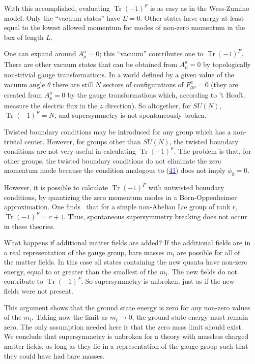 \documentclass[11pt,a4paper]{article}
\newcommand{\eqnref}[1]{(\hyperlink{eq:#1}{\textcolor{blue}{#1}})}
\begin{document}
With this accomplished, evaluating $\operatorname{Tr}(-1)^F$ is as easy as in the
Wess-Zumino model. Only the ``vacuum states'' have $E = 0$. Other
states have energy at least equal to the lowest allowed momentum for
modes of non-zero momentum in the box of length $L$.

One can expand around $A_\mu^a = 0$; this ``vacuum'' contributes one to
$\operatorname{Tr}(-1)^F$. There are other vacuum states that can be obtained from
$A_\mu^a = 0$ by topologically non-trivial gauge transformations. In a
world defined by a given value of the vacuum angle $\theta$ there are still
$N$ sectors of configurations of $F_{\mu\nu}^a = 0$ (they are created from $A_\mu^a = 0$
by the gauge transformations which, according to 't Hooft, measure
the electric flux in the $z$ direction). So altogether, for $SU(N)$,
$\operatorname{Tr}(-1)^F = N$, and supersymmetry is not spontaneously broken.

Twisted boundary conditions may be introduced for any group
which has a non-trivial center. However, for groups other than $SU(N)$,
the twisted boundary conditions are not very useful in calculating
$\operatorname{Tr}(-1)^F$. The problem is that, for other groups, the twisted boundary
conditions do not eliminate the zero momentum mode because the
condition analogous to \eqnref{41} does not imply $\phi_0 = 0$.

However, it is possible to calculate $\operatorname{Tr}(-1)^F$ with untwisted
boundary conditions, by quantizing the zero momentum modes in a
Born-Oppenheimer approximation. One finds~\cite{ref12} that for a simple non-Abelian
Lie group of rank $r$, $\operatorname{Tr}(-1)^F = r + 1$. Thus, spontaneous supersymmetry
breaking does not occur in these theories.

What happens if additional matter fields are added? If the additional
fields are in a real representation of the gauge group, bare
masses $m_i$ are possible for all of the matter fields. In this case
all states containing the new quanta have non-zero energy, equal to
or greater than the smallest of the $m_i$. The new fields do not contribute
to $\operatorname{Tr}(-1)^F$. So supersymmetry is unbroken, just as if the
new fields were not present.

This argument shows that the ground state energy is zero for any
non-zero values of the $m_i$. Taking now the limit as $m_i \to 0$, the ground
state energy must remain zero. The only assumption needed here is that
the zero mass limit should exist. We conclude that supersymmetry is
unbroken for a theory with massless charged matter fields, as long as
they lie in a representation of the gauge group such that they could
have had bare masses.
\end{document}
